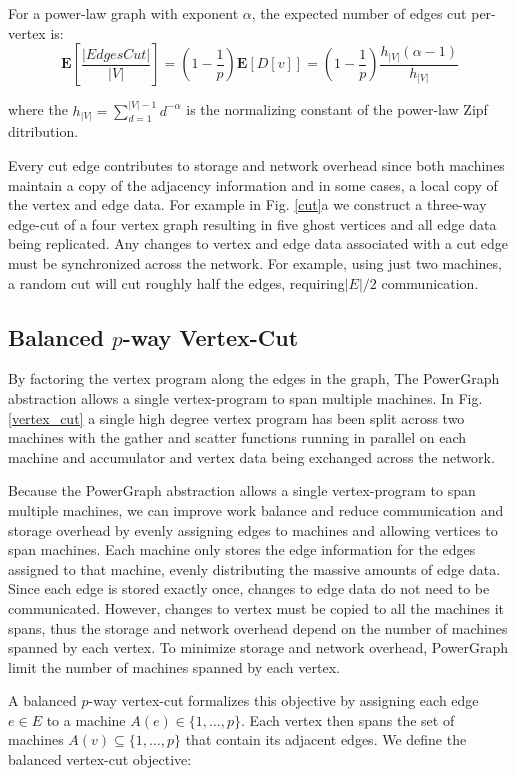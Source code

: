 \documentclass {article}
\begin{document}
For a power-law graph with exponent $\alpha$, the expected
number of edges cut per-vertex is:
\begin{equation}
  \textbf{E}[\frac{|Edges Cut|}{|V|}]=(1-\frac{1}{p})\textbf{E}
  [D[v]]=(1-\frac{1}{p})\frac{h_{|V|}(\alpha - 1)}{h_{|V|}}
\end{equation}

where the $h_{|V|}=\sum_{d=1}^{|V|-1}d^{-\alpha}$ is the normalizing
constant of the power-law Zipf ditribution.

Every cut edge contributes to storage and network overhead since
both machines maintain a copy of the adjacency information and 
in some cases, a local copy of the vertex and edge data. For example
in Fig. \ref{cut}a we construct a three-way edge-cut of a four vertex
graph resulting in five ghost vertices and all edge data being
replicated. Any changes to vertex and edge data associated with
a cut edge must be synchronized across the network. For example, 
using just two machines, a random cut will cut roughly half the edges, 
requiring$|E|/2$ communication.

\subsection{Balanced $p$-way Vertex-Cut}
By factoring the vertex program along the edges in the
graph, The PowerGraph abstraction allows a single vertex-program
to span multiple machines. In Fig. \ref{vertex_cut} a single high
degree vertex program has been split across two machines
with the gather and scatter functions running in parallel
on each machine and accumulator and vertex data being
exchanged across the network.

Because the PowerGraph abstraction allows a single vertex-program 
to span multiple machines, we can improve work balance and reduce
communication and storage overhead by evenly assigning edges to 
machines and allowing vertices to span machines. Each machine only
stores the edge information for the edges assigned to that
machine, evenly distributing the massive amounts of edge
data. Since each edge is stored exactly once, changes to
edge data do not need to be communicated. However, changes to vertex
must be copied to all the machines it spans, thus the storage and
network overhead depend on the number of machines spanned by each vertex.
To minimize storage and network overhead, PowerGraph limit the number 
of machines spanned by each vertex.


A balanced $p$-way vertex-cut formalizes this objective
by assigning each edge $e \in E$ to a machine $A(e) \in \{1,\dots,p\}$.
Each vertex then spans the set of machines $A(v) \subseteq \{1,\dots, p\}$
that contain its adjacent edges. We define the balanced vertex-cut objective:
\end{document}
